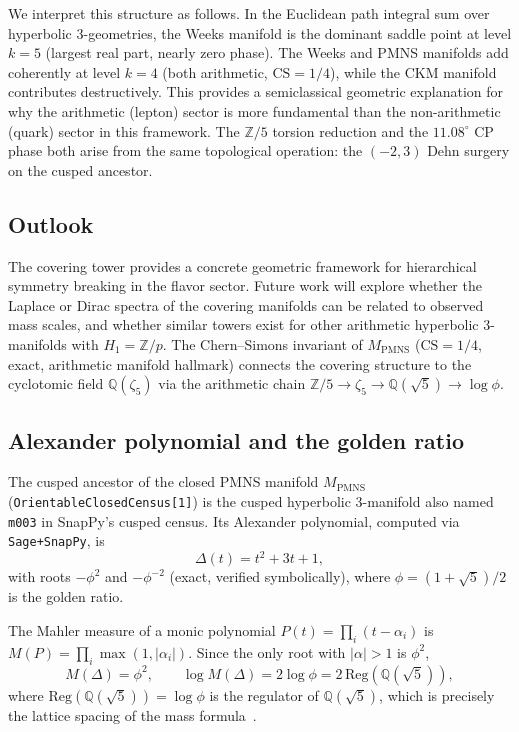\documentclass[12pt]{article}
\theoremstyle{definition}
\begin{document}
We interpret this structure as follows.
In the Euclidean path integral sum over hyperbolic 3-geometries,
the Weeks manifold is the dominant saddle point at level $k=5$
(largest real part, nearly zero phase).
The Weeks and PMNS manifolds add coherently at level $k=4$
(both arithmetic, $\mathrm{CS}=1/4$), while the CKM manifold
contributes destructively.
This provides a semiclassical geometric explanation for why the
arithmetic (lepton) sector is more fundamental than the
non-arithmetic (quark) sector in this framework.
The $\mathbb{Z}/5$ torsion reduction and the $11.08^\circ$ CP phase
both arise from the same topological operation: the $(-2,3)$
Dehn surgery on the cusped ancestor.


\subsection{Outlook}

The covering tower provides a concrete geometric framework for
hierarchical symmetry breaking in the flavor sector. Future work
will explore whether the Laplace or Dirac spectra of the covering
manifolds can be related to observed mass scales, and whether
similar towers exist for other arithmetic hyperbolic 3-manifolds
with $H_1=\mathbb{Z}/p$. The Chern--Simons invariant of $M_\text{PMNS}$
($\mathrm{CS}=1/4$, exact, arithmetic manifold hallmark) connects
the covering structure to the cyclotomic field
$\mathbb{Q}(\zeta_5)$ via the arithmetic chain
$\mathbb{Z}/5\to\zeta_5\to\mathbb{Q}(\sqrt{5})\to\log\phi$.


\subsection{Alexander polynomial and the golden ratio}
\label{subsec:alexander}

The cusped ancestor of the closed PMNS manifold $M_\text{PMNS}$
(\texttt{OrientableClosedCensus[1]}) is the cusped hyperbolic 3-manifold
also named \texttt{m003} in SnapPy's cusped census.  Its Alexander
polynomial, computed via \texttt{Sage+SnapPy}, is
\[
\Delta(t) = t^2 + 3t + 1,
\]
with roots $-\phi^2$ and $-\phi^{-2}$ (exact, verified symbolically),
where $\phi = (1+\sqrt5)/2$ is the golden ratio.

The Mahler measure of a monic polynomial $P(t)=\prod_i(t-\alpha_i)$ is
$M(P)=\prod_i\max(1,|\alpha_i|)$.  Since the only root with $|\alpha|>1$
is $\phi^2$,
\[
M(\Delta) = \phi^2, \qquad
\log M(\Delta) = 2\log\phi = 2\,\mathrm{Reg}(\mathbb{Q}(\sqrt{5})),
\]
where $\mathrm{Reg}(\mathbb{Q}(\sqrt{5}))=\log\phi$ is the regulator of
$\mathbb{Q}(\sqrt{5})$, which is precisely the lattice spacing of the
mass formula~\cite{Gentry:ShapeSpace}.
\end{document}
